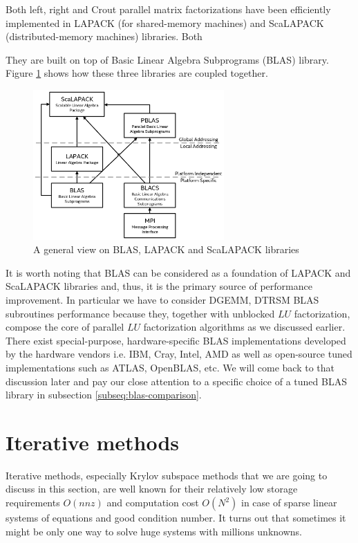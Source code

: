 Both left, right and Crout parallel matrix factorizations have been efficiently implemented in LAPACK (for shared-memory machines) and ScaLAPACK (distributed-memory machines) libraries. Both 

They are built on top of Basic Linear Algebra Subprograms (BLAS) library. Figure \ref{fig:blas-lapack-scalapack} shows how these three libraries are coupled together.

\begin{figure}[htpb]
  \centering
  \includegraphics[width=0.65\textwidth]{figures/chapter-2/lapack-scalapack-blas.png}
\caption{A general view on BLAS, LAPACK and ScaLAPACK libraries \cite{netlib:lapack-scalapack-general-view}}
\label{fig:blas-lapack-scalapack}
\end{figure}

It is worth noting that BLAS can be considered as a foundation of LAPACK and ScaLAPACK libraries and, thus, it is the primary source of performance improvement. In particular we have to consider DGEMM, DTRSM BLAS subroutines performance because they, together with unblocked $LU$ factorization, compose the core of parallel $LU$ factorization algorithms as we discussed earlier.\\

There exist special-purpose, hardware-specific BLAS implementations developed by the hardware vendors i.e. IBM, Cray, Intel, AMD as well as open-source tuned implementations such as ATLAS, OpenBLAS, etc. We will come back to that discussion later and pay our close attention to a specific choice of a tuned BLAS library in subsection \ref{subseq:blas-comparison}.


\section{Iterative methods}
\label{subseq:iterative methods}
Iterative methods, especially Krylov subspace methods that we are going to discuss in this section, are well known for their relatively low storage requirements $O(nnz)$ and computation cost $O(N^2)$ in case of sparse linear systems of equations and good condition number. It turns out that sometimes it might be only one way to solve huge systems with millions unknowns.\\

